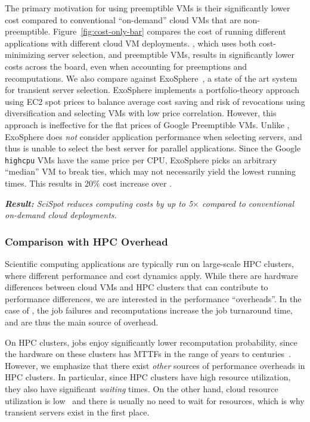 The primary motivation for using preemptible VMs is their significantly lower cost compared to conventional ``on-demand'' cloud VMs that are non-preemptible. 
Figure~\ref{fig:cost-only-bar} compares the cost of running different applications with different cloud VM deployments. 
\sysname, which uses both cost-minimizing server selection, and preemptible VMs, results in significantly lower costs across the board, even when accounting for preemptions and recomputations. 
%
We also compare against ExoSphere~\cite{exosphere}, a state of the art  system for transient server selection.
ExoSphere implements a portfolio-theory approach using EC2 spot prices to balance average cost saving and risk of revocations using diversification and selecting VMs with low price correlation.
However, this approach is ineffective for the flat prices of Google Preemptible VMs. 
Unlike \sysname, ExoSphere does \emph{not} consider application performance when selecting servers, and thus is unable to select the best server for parallel applications. 
Since the Google \texttt{highcpu} VMs have the same price per CPU, ExoSphere picks an arbitrary ``median'' VM to break ties, which may not necessarily yield the lowest running times.
This results in 20\% cost increase over \sysname. 

\noindent \emph{\textbf{Result:} SciSpot reduces computing costs by up to 5$\times$ compared to conventional on-demand cloud deployments.}


\subsubsection{Comparison with HPC Overhead}

Scientific computing applications are typically run on large-scale HPC clusters, where different performance and cost dynamics apply.
While there are hardware differences between cloud VMs and HPC clusters that can contribute to performance differences, we are interested in the performance ``overheads''.
In the case of \sysname, the job failures and recomputations increase the job turnaround time, and are thus the main source of overhead.

On HPC clusters, jobs enjoy significantly lower recomputation probability, since the hardware on these clusters has MTTFs in the range of years to centuries~\cite{dongarra_fault_nodate}.
However, we emphasize that there exist \emph{other} sources of performance overheads in HPC clusters.
In particular, since HPC clusters have high resource utilization, they also have significant \emph{waiting} times. 
On the other hand, cloud resource utilization is low~\cite{borg} and there is usually no need to wait for resources, which is why transient servers exist in the first place. 



